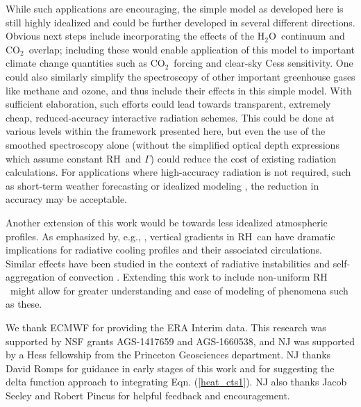 \documentclass{ametsoc}
\newcommand{\eqnref}[1]{(\ref{#1})}
\newcommand{\cotwo}{\ensuremath{\mathrm{CO_2}}}
\newcommand{\htwo}{\ensuremath{\mathrm{H_2O}}}
\newcommand{\RH}{\ensuremath{\mathrm{RH}}}
\begin{document}
While such applications are encouraging, the simple model as developed here is still highly idealized and could be further developed in several different directions. Obvious next steps include incorporating the effects of the \htwo\ continuum and \cotwo\ overlap; including these would enable application of this model to important climate change quantities such as  \cotwo\ forcing and clear-sky Cess sensitivity. One could also similarly simplify the spectroscopy of other important greenhouse gases like methane and ozone, and thus include their effects in this simple model. With sufficient elaboration, such efforts could lead towards transparent, extremely cheap, reduced-accuracy interactive radiation schemes. This could be done at various levels within the framework presented here, but even the use of the smoothed spectroscopy  alone (without the simplified optical depth expressions which assume constant \RH\ and $\Gamma$) could reduce the cost of existing radiation calculations. For applications where high-accuracy radiation is not required, such as short-term weather forecasting or idealized modeling \citep[e.g. idealized aquaplanets such as that of][]{frierson2006}, the reduction in accuracy may be acceptable.

Another extension of this work would be towards less idealized atmospheric profiles. As emphasized by, e.g., \cite{stevens2017},  vertical gradients in \RH\ can have dramatic implications for radiative cooling profiles and their associated  circulations. Similar effects have been studied in the context of radiative instabilities and self-aggregation of convection \citep{beucler2018,beucler2016,emanuel2014}. Extending this work to include non-uniform \RH\ might allow for greater understanding and  ease of modeling of phenomena such as these. 



%
\acknowledgments
We thank ECMWF for providing the ERA Interim data. This research was supported by NSF grants AGS-1417659 and AGS-1660538, and NJ was supported by a  Hess fellowship from the Princeton Geosciences department. NJ thanks David Romps for guidance in early stages of this work and for suggesting the delta function approach to integrating Eqn. \eqnref{heat_cts1}. NJ also thanks  Jacob Seeley and Robert Pincus for helpful feedback and encouragement.
\end{document}
